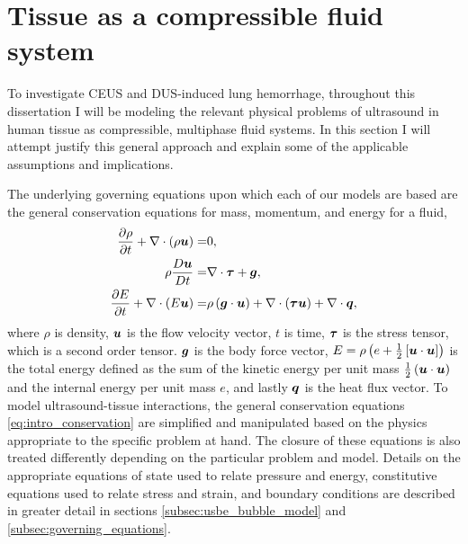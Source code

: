 \section{Tissue as a compressible fluid system}
To investigate \ac{CEUS} and \ac{DUS}-induced lung hemorrhage,
throughout this dissertation I will be modeling the relevant physical
problems of ultrasound in human tissue as compressible, multiphase
fluid systems. In this section I will attempt justify this general
approach and explain some of the applicable assumptions and
implications.

The underlying governing equations upon which each of our models are
based are the general conservation equations for mass, momentum, and
energy for a fluid,
\begin{subequations} \label{eq:intro_conservation}             
  \begin{align}
    \frac{\partial \rho}{\partial t} + \nabla\cdot\left(\rho\bs{u}\right) =& 0,\\%
    \rho\frac{D \bs{u}}{D t} =& \nabla\cdot\bs{\tau}+\bs{g},\\%
    \frac{\partial E}{\partial t} + \nabla\cdot\left(E \bs{u}\right) =& \rho\left(\bs{g}\cdot\bs{u}\right) + \nabla\cdot\left(\bs{\tau u}\right) + \nabla\cdot\bs{q},%
  \end{align}
\end{subequations}
where $\rho$ is density, $\boldsymbol{u}$ is the flow velocity vector, $t$ is
time, $\boldsymbol{\tau}$ is the stress tensor, which is a second order
tensor. $\boldsymbol{g}$ is the body force vector,
$E = \rho \left(e + \frac{1}{2}\left[\boldsymbol{u}\cdot\boldsymbol{u}\right]\right)$
is the total energy defined as the sum of the kinetic energy per unit
mass $\frac{1}{2}\left(\boldsymbol{u}\cdot\boldsymbol{u}\right)$ and the internal
energy per unit mass $e$, and lastly $\boldsymbol{q}$ is the heat flux
vector. To model ultrasound-tissue interactions, the general
conservation equations \eqref{eq:intro_conservation} are simplified
and manipulated based on the physics appropriate to the specific
problem at hand. The closure of these equations is also treated
differently depending on the particular problem and model. Details on
the appropriate equations of state used to relate pressure and energy,
constitutive equations used to relate stress and strain, and boundary
conditions are described in greater detail in sections
\ref{subsec:usbe_bubble_model} and \ref{subsec:governing_equations}.

